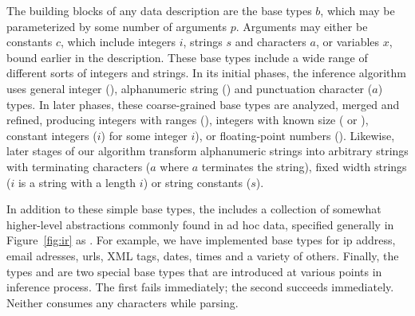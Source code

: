 The building blocks of any \ir{} data description are the base types $b$,
which may be parameterized by some number of arguments $p$.  Arguments
may either be constants $c$, which include integers $i$, strings
$s$ and characters $a$, or variables $x$, bound earlier in the description.
These base types include a wide range of different sorts of
integers and strings.  In its initial phases, the inference algorithm
uses general integer (), alphanumeric string ()
and punctuation character ($a$\cd{)}) types.  In later phases,
these coarse-grained base types are analyzed, merged and refined, producing
integers with ranges (),
integers with known size ( or ), constant integers
($i$\cd{)}) for some integer $i$), or floating-point
numbers ().  Likewise, later stages of our algorithm transform
alphanumeric strings into arbitrary strings with terminating characters
($a$\cd{)} where $a$ terminates the string), fixed width
strings ($i$\cd{)} is a string with a length $i$) 
or string constants  ($s$\cd{)}).  

In addition to these simple base types, the \ir{} includes a
collection of somewhat higher-level abstractions commonly found in ad
hoc data, specified generally in Figure~\ref{fig:ir} as .
For example, we have implemented base types for ip address, email
adresses, urls, XML tags, dates, times and a variety of
others. Finally, the types  and  are two special
base types that are introduced at various points in inference process.
The first fails immediately; the second succeeds immediately.  Neither
consumes any characters while parsing.

